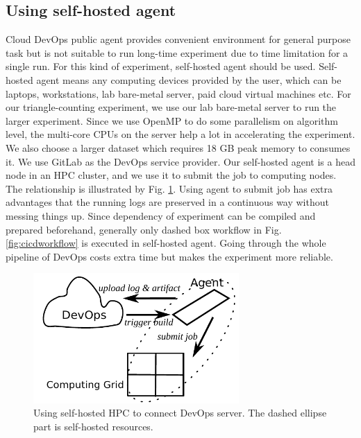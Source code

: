 \documentclass[10pt, conference, compsocconf]{IEEEtran}
\begin{document}
\subsection{Using self-hosted agent}
Cloud DevOps public agent provides convenient environment for general purpose task but is not suitable to run long-time experiment due to time limitation for a single run. For this kind of experiment, self-hosted agent should be used. Self-hosted agent means any computing devices provided by the user, which can be laptops, workstations, lab bare-metal server, paid cloud virtual machines etc.
For our triangle-counting experiment, we use our lab bare-metal server to run the larger experiment. Since we use OpenMP to do some parallelism on algorithm level, the multi-core CPUs on the server help a lot in accelerating the experiment. We also choose a larger dataset which requires 18 GB peak memory to consumes it. We use GitLab as the DevOps service provider. Our self-hosted agent is a head node in an HPC cluster, and we use it to submit the job to computing nodes.
The relationship is illustrated by Fig. \ref{fig:selfhosted}. Using agent to submit job has extra advantages that the running logs are preserved in a continuous way without messing things up. Since dependency of experiment can be compiled and prepared beforehand, generally only dashed box workflow in Fig. \ref{fig:cicdworkflow}
is executed in self-hosted agent. Going through the whole pipeline of DevOps costs extra time but makes the experiment more reliable.

\begin{figure}[!ht]
\centerline{\includegraphics[width=18.5pc]{self-hosted.pdf}}
\caption{Using self-hosted HPC to connect DevOps server. The dashed ellipse part is self-hosted resources.}\label{fig:selfhosted}
\end{figure}
\end{document}
